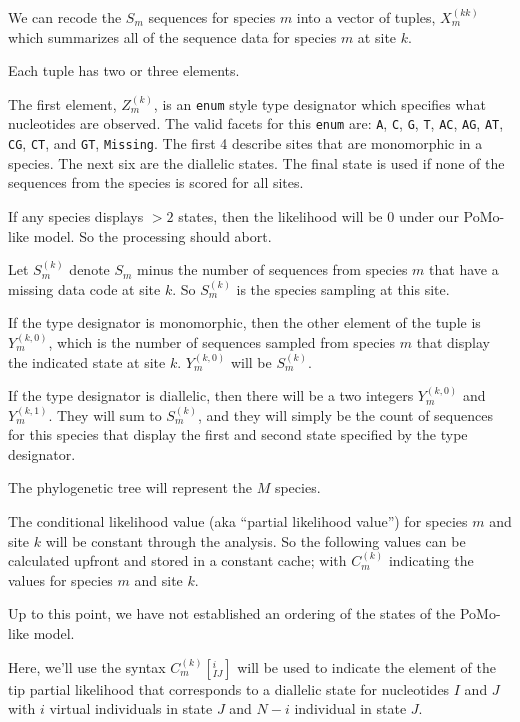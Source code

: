 \documentclass{llncs}
\newcommand{\pomo}{PoMo\xspace}
\begin{document}
We can recode the $S_m$ sequences for species $m$ into a vector of tuples, $X_m^{(kk)}$ which 
    summarizes all of the sequence data for species $m$ at site $k$.

Each tuple has two or three elements.

The first element, $Z_m^{(k)}$, is an {\tt enum} style type designator which specifies what nucleotides are observed.
The valid facets for this {\tt enum} are: \texttt{A}, \texttt{C}, \texttt{G}, \texttt{T}, \texttt{AC}, \texttt{AG}, \texttt{AT}, \texttt{CG}, \texttt{CT}, and \texttt{GT}, \texttt{Missing}.
The first 4 describe sites that are monomorphic in a species.
The next six are the diallelic states.
The final state is used if none of the sequences from the species is scored for all sites.

If any species displays $>2$ states, then the likelihood will be 0 under our \pomo-like model.
So the processing should abort.

Let $S_m^{(k)}$ denote $S_m$ minus the number of sequences from species $m$ that have a missing data code at site $k$. 
So $S_m^{(k)}$ is the species sampling at this site.

If the type designator is monomorphic, then the other element of the tuple is $Y_m^{(k,0)}$, which is the number of sequences sampled from species $m$ that display the indicated state at site $k$.
$Y_m^{(k,0)}$ will be $S_m^{(k)}$.


If the type designator is diallelic, then there will be a two integers $Y_m^{(k,0)}$ and $Y_m^{(k,1)}$.
They will sum to $S_m^{(k)}$, and they will simply be the count of sequences for this species that display the first and second state specified by the type designator.

The phylogenetic tree will represent the $M$ species.

The conditional likelihood value (aka ``partial likelihood value'') for species $m$ and site $k$ will be constant through the analysis.
So the following values can be calculated upfront and stored in a constant cache;
with $C_m^{(k)}$ indicating the values for species $m$ and site $k$.

Up to this point, we have not established an ordering of the states of the \pomo-like model.

Here, we'll use the syntax $C_m^{(k)}[^{i}_{IJ}]$ will be used to indicate the element of 
    the tip partial likelihood that corresponds to a diallelic state for nucleotides $I$ and $J$
    with $i$ virtual individuals in state $J$ and $N-i$ individual in state $J$.
\end{document}
